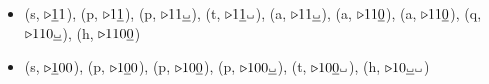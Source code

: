 \documentclass[11pt]{article}
\newcommand{\blank}{\setlength{\unitlength}{1pt}\begin{picture}(6,4.2)
\put(1,.5){\line(1,0){4}}
\multiput(1,.5)(4,0){2}{\line(0,1){2}}
\end{picture}
}
\begin{document}
\begin{itemize}
\begin{itemize}
{{{\begin{itemize}
			\item{
				(s, $\triangleright\uline{1}1$), (p, $\triangleright1\uline{1}$), (p, $\triangleright11\uline{\blank}$), (t, $\triangleright1\uline{1}\blank$), (a, $\triangleright11\uline{\blank}$), (a, $\triangleright11\uline{0}$), (a, $\triangleright11\uline{0}$), (q, $\triangleright110\uline{\blank}$), (h, $\triangleright110\uline{0}$) 
			}
			
			\item{
				(s, $\triangleright\uline{1}00$), (p, $\triangleright1\uline{0}0$), (p, $\triangleright10\uline{0}$), (p, $\triangleright100\uline{\blank}$), (t, $\triangleright10\uline{0}\blank$), (h, $\triangleright10\uline{\blank}\blank$)
			}
		\end{itemize}
        }
     }
  }
\end{itemize}

\end{itemize}
\end{document}
